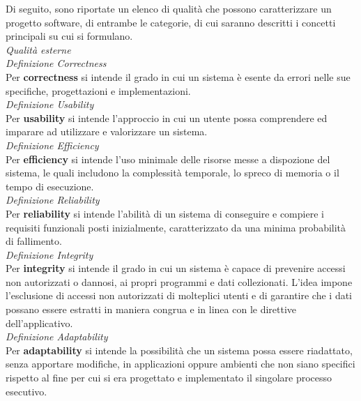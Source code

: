 \documentclass{article}
\begin{document}
Di seguito, sono riportate un elenco di qualità che possono caratterizzare un progetto software, di entrambe le categorie, di cui saranno descritti i concetti principali su cui si formulano.\vspace*{14pt}\\
\textit{Qualità esterne}\\
\textit{Definizione Correctness}\\
Per \textbf{correctness} si intende il grado in cui un sistema è esente da errori nelle sue specifiche, progettazioni e implementazioni.\vspace*{14pt}\\
\textit{Definizione Usability}\\
Per \textbf{usability} si intende l'approccio in cui un utente possa comprendere ed imparare ad utilizzare e valorizzare un sistema.\vspace*{14pt}\\
\textit{Definizione Efficiency}\\
Per \textbf{efficiency} si intende l'uso minimale delle risorse messe a dispozione del sistema, le quali includono la complessità temporale, lo spreco di memoria o il tempo di esecuzione.\vspace*{14pt}\\
\textit{Definizione Reliability}\\
Per \textbf{reliability} si intende l'abilità di un sistema di conseguire e compiere i requisiti funzionali posti inizialmente, caratterizzato da una minima probabilità di fallimento.\vspace*{14pt}\\
\textit{Definizione Integrity}\\
Per \textbf{integrity} si intende il grado in cui un sistema è capace di prevenire accessi non autorizzati o dannosi, ai propri programmi e dati collezionati. L'idea impone l'esclusione di accessi non autorizzati di molteplici utenti e di garantire che i dati possano essere estratti in maniera congrua e in linea con le direttive dell'applicativo.\vspace*{14pt}\\
\textit{Definizione Adaptability}\\
Per \textbf{adaptability} si intende la possibilità che un sistema possa essere riadattato, senza apportare modifiche, in applicazioni oppure ambienti che non siano specifici rispetto al fine per cui si era progettato e implementato il singolare processo esecutivo.\vspace*{14pt}\\
\end{document}
